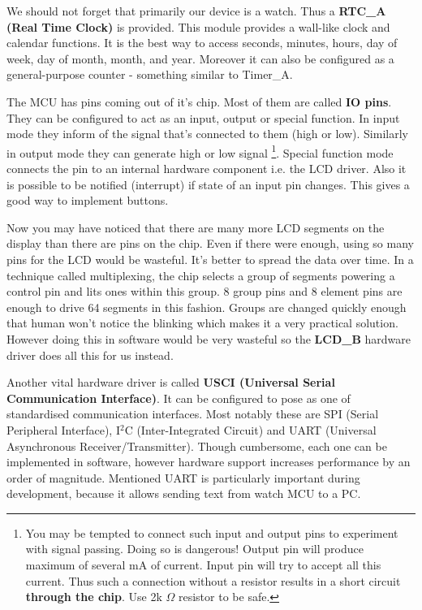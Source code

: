 We should not forget that primarily our device is a watch. Thus a {\bf
RTC\_A (Real Time Clock)} is provided. This module provides a
wall-like clock and calendar functions. It is the best way to access
seconds, minutes, hours, day of week, day of month, month, and year.
Moreover it can also be configured as a general-purpose counter -
something similar to Timer\_A.

The MCU has pins coming out of it's chip. Most of them are called {\bf
IO pins}. They can be configured to act as an input, output or special
function.  In input mode they inform of the signal that's connected to
them (high or low). Similarly in output mode they can generate high or
low signal \footnote[1]{You may be tempted to connect such input and
output pins to experiment with signal passing. Doing so is dangerous!
Output pin will produce maximum of several mA of current. Input pin
will try to accept all this current. Thus such a connection without a
resistor results in a short circuit {\bf through the chip}. Use 2k
$\Omega$ resistor to be safe.}. Special function mode connects the pin
to an internal hardware component i.e.  the LCD driver.  Also it is
possible to be notified (interrupt) if state of an input pin changes.
This gives a good way to implement buttons.

Now you may have noticed that there are many more LCD segments on the
display than there are pins on the chip. Even if there were enough,
using so many pins for the LCD would be wasteful. It's better to
spread the data over time. In a technique called multiplexing, the
chip selects a group of segments powering a control pin and lits ones
within this group. 8 group pins and 8 element pins are enough to drive
64 segments in this fashion. Groups are changed quickly enough that human
won't notice the blinking which makes it a very practical solution.
However doing this in software would be very wasteful so the {\bf
LCD\_B} hardware driver does all this for us instead.

Another vital hardware driver is called {\bf USCI (Universal Serial
Communication Interface)}. It can be configured to pose as one of
standardised communication interfaces. Most notably these are SPI
(Serial Peripheral Interface), I$^2$C (Inter-Integrated Circuit) and
UART (Universal Asynchronous Receiver/Transmitter). Though cumbersome,
each one can be implemented in software, however hardware support
increases performance by an order of magnitude. Mentioned UART is
particularly important during development, because it allows sending
text from watch MCU to a PC.

